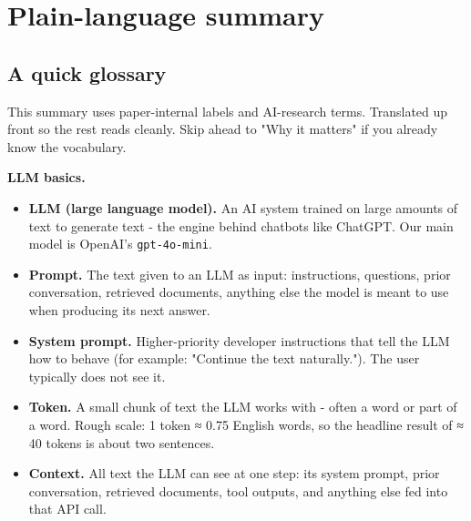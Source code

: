 \documentclass{article}
\theoremstyle{plain}
\theoremstyle{definition}
\begin{document}
\begin{abstract}
Practically, this means recursive-loop evaluations should
distinguish transient movement from durable escape, always subtract
stochastic floors, and treat context-update rules as first-class
safety-relevant design choices rather than implementation details.
We report 37 experiments on \texttt{gpt-4o-mini}, with within-vendor
replication on \texttt{gpt-4.1-nano} and public code, configurations,
trajectories, and reports
(<https://github.com/kaplan196883/llmattr>).

---
\end{abstract}



\section*{Plain-language summary}

\subsection*{A quick glossary}

This summary uses paper-internal labels and AI-research terms.
Translated up front so the rest reads cleanly. Skip ahead to "Why it
matters" if you already know the vocabulary.

\textbf{LLM basics.}

\begin{itemize}
  \item \textbf{LLM (large language model).} An AI system trained on large
  amounts of text to generate text - the engine behind chatbots like
  ChatGPT. Our main model is OpenAI's \texttt{gpt-4o-mini}.
  \item \textbf{Prompt.} The text given to an LLM as input: instructions,
  questions, prior conversation, retrieved documents, anything else
  the model is meant to use when producing its next answer.
  \item \textbf{System prompt.} Higher-priority developer instructions that
  tell the LLM how to behave (for example: "Continue the text
  naturally."). The user typically does not see it.
  \item \textbf{Token.} A small chunk of text the LLM works with - often a word
  or part of a word. Rough scale: 1 token ≈ 0.75 English words, so
  the headline result of ≈ 40 tokens is about two sentences.
  \item \textbf{Context.} All text the LLM can see at one step: its system
  prompt, prior conversation, retrieved documents, tool outputs, and
  anything else fed into that API call.
\end{itemize}
\end{document}

